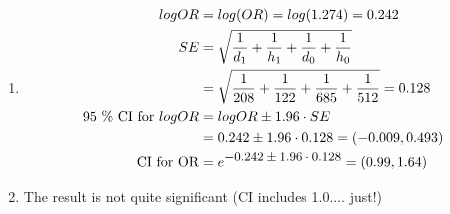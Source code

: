 \documentclass[12pt,a4paper,twoside]{article}
\begin{document}
\begin{enumerate}[label=\bfseries Q\arabic*.]
\begin{enumerate}
  \item 
    \begin{align*}
      logOR                     & =log(OR)=log(1.274)= 0.242                                                \\
      SE                        & =\sqrt{\frac{1}{d_{1}}+\frac{1}{h_{1}}+\frac{1}{d_{0}}+\frac{1}{h_{0}}}   \\
                                & =\sqrt{\frac{1}{208}+\frac{1}{122}+\frac{1}{685}+\frac{1}{512}}=0.128 \\       
      \text{95 \% CI for }logOR & = logOR \pm 1.96 \cdot SE                                                 \\
                                & = 0.242 \pm 1.96 \cdot 0.128 = (-0.009, 0.493)                            \\
      \text{CI for OR}          & = e^{\mbox{\small$-0.242 \pm 1.96 \cdot 0.128$}}=(0.99, 1.64)
    \end{align*}
  \item
    The result is not quite significant (CI includes 1.0.... just!)
  \end{enumerate}
\end{enumerate}
\end{document}
